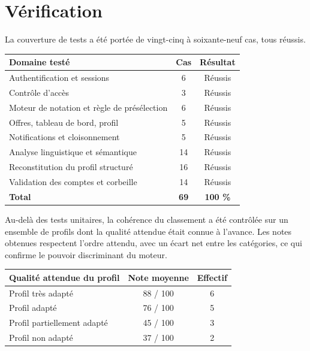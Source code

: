 \documentclass[11pt,a4paper]{article}
\begin{document}
\section{Vérification}
La couverture de tests a été portée de vingt-cinq à soixante-neuf cas, tous réussis.

\begin{center}
\small
\begin{tabular}{lcc}
  \toprule
  \textbf{Domaine testé} & \textbf{Cas} & \textbf{Résultat} \\
  \midrule
  Authentification et sessions & 6 & \textcolor{vert}{Réussis} \\
  Contrôle d'accès & 3 & \textcolor{vert}{Réussis} \\
  Moteur de notation et règle de présélection & 6 & \textcolor{vert}{Réussis} \\
  Offres, tableau de bord, profil & 5 & \textcolor{vert}{Réussis} \\
  Notifications et cloisonnement & 5 & \textcolor{vert}{Réussis} \\
  Analyse linguistique et sémantique & 14 & \textcolor{vert}{Réussis} \\
  Reconstitution du profil structuré & 16 & \textcolor{vert}{Réussis} \\
  Validation des comptes et corbeille & 14 & \textcolor{vert}{Réussis} \\
  \midrule
  \textbf{Total} & \textbf{69} & \textcolor{vert}{\textbf{100 \%}} \\
  \bottomrule
\end{tabular}
\end{center}

\vspace{2mm}
\noindent Au-delà des tests unitaires, la cohérence du classement a été contrôlée sur un ensemble de profils dont la qualité attendue était connue à l'avance. Les notes obtenues respectent l'ordre attendu, avec un écart net entre les catégories, ce qui confirme le pouvoir discriminant du moteur.

\begin{center}
\small
\begin{tabular}{lcc}
  \toprule
  \textbf{Qualité attendue du profil} & \textbf{Note moyenne} & \textbf{Effectif} \\
  \midrule
  Profil très adapté & 88 / 100 & 6 \\
  Profil adapté & 76 / 100 & 5 \\
  Profil partiellement adapté & 45 / 100 & 3 \\
  Profil non adapté & 37 / 100 & 2 \\
  \bottomrule
\end{tabular}
\end{center}
\end{document}
